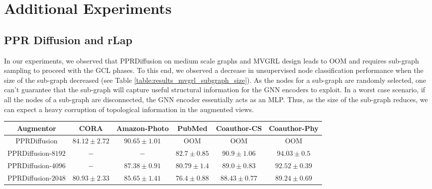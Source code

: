 \documentclass{article}
\theoremstyle{plain}
\theoremstyle{definition}
\theoremstyle{remark}
\begin{document}
\section{Additional Experiments}
\label{app:add_exp}

\subsection{PPR Diffusion and rLap}

In our experiments, we observed that PPRDiffusion on medium scale graphs and MVGRL design leads to OOM and requires sub-graph sampling to proceed with the GCL phases. To this end, we observed a decrease in unsupervised node classification performance when the size of the sub-graph decreased (see Table \ref{table:results_mvgrl_subgraph_size}). As the nodes for a sub-graph are randomly selected, one can't guarantee that the sub-graph will capture useful structural information for the GNN encoders to exploit. In a worst case scenario, if all the nodes of a sub-graph are disconnected, the GNN encoder essentially acts as an MLP. Thus, as the size of the sub-graph reduces, we can expect a heavy corruption of topological information in the augmented views.

\begin{table*}[ht!]
\centering
\caption{Evaluation (in accuracy) on benchmark node datasets with \textbf{MVGRL} based design and PPR Diffusion with varying sub-graph sizes. PPRDiffusion indicates the full graph view and PPRDiffusion-$x$ indicates a sampled sub-graph with $x$ nodes as the graph view. }
\label{table:results_mvgrl_subgraph_size}
\vskip 0.15in
\begin{center}
\begin{small}
\begin{sc}
\begin{tabular}{c|c|c|c|c|c}
\toprule
Augmentor & CORA & Amazon-Photo & PubMed & Coauthor-CS & Coauthor-Phy \\
\midrule
PPRDiffusion & $84.12 \pm 2.72$  & $90.65 \pm 1.01$  & OOM & OOM & OOM \\
PPRDiffusion-$8192$ & $-$  & $-$  & $82.7 \pm 0.85$ & $90.9 \pm 1.06$ & $94.03 \pm 0.5$ \\
PPRDiffusion-$4096$ & $-$ & $87.38 \pm 0.91$ & $80.79 \pm 1.4$ & $89.0 \pm 0.83$ & $92.52 \pm 0.39$ \\
PPRDiffusion-$2048$ & $80.93 \pm 2.33$ & $85.65 \pm 1.41$ & $76.4 \pm 0.88$ & $88.43 \pm 0.77$ & $89.24 \pm 0.69$ \\
\bottomrule
\end{tabular}
\end{sc}
\end{small}
\end{center}
\vskip -0.1in
\end{table*}
\end{document}
